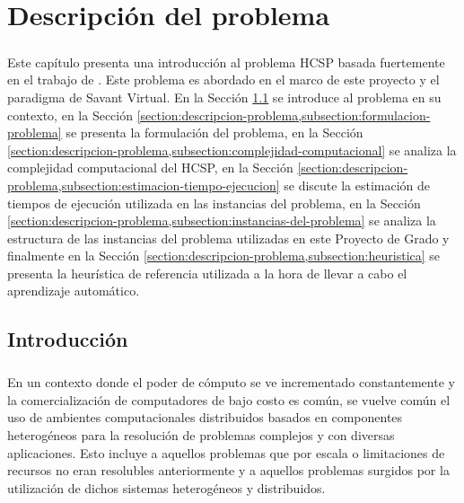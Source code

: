 \chapter{Descripción del problema} \label{section-descripcion-problema}

\paragraph{}Este capítulo presenta una introducción al problema HCSP basada fuertemente en el trabajo de \citet{bib-doctorado-nesmachnow}.
Este problema es abordado en el marco de este proyecto y el paradigma de Savant Virtual.
En la Sección \ref{section:descripcion-problema,subsection:introduccion} se introduce al problema en su contexto, en la Sección \ref{section:descripcion-problema,subsection:formulacion-problema} se presenta la formulación del problema, en la Sección \ref{section:descripcion-problema,subsection:complejidad-computacional} se analiza la complejidad computacional del HCSP, en la Sección \ref{section:descripcion-problema,subsection:estimacion-tiempo-ejecucion} se discute la estimación de tiempos de ejecución utilizada en las instancias del problema, en la Sección \ref{section:descripcion-problema,subsection:instancias-del-problema} se analiza la estructura de las instancias del problema utilizadas en este Proyecto de Grado y finalmente en la Sección \ref{section:descripcion-problema,subsection:heuristica} se
presenta la heurística de referencia utilizada a la hora de llevar a cabo el aprendizaje automático.

\section{Introducción} \label{section:descripcion-problema,subsection:introduccion}

 
\paragraph{}En un contexto donde el poder de cómputo se ve incrementado constantemente y la comercialización de computadores de bajo costo es común, se vuelve común el uso de ambientes computacionales distribuidos basados en componentes heterogéneos para la resolución de problemas complejos y con diversas aplicaciones.
Esto incluye a aquellos problemas que por escala o limitaciones de recursos no eran resolubles anteriormente y a aquellos problemas surgidos por la utilización de dichos sistemas heterogéneos y distribuidos. 

